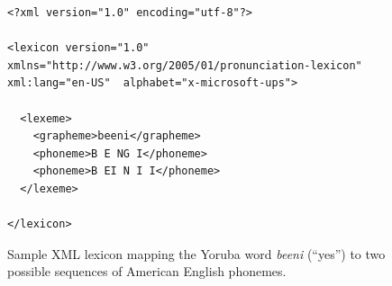 \documentclass[11pt]{article}
\begin{document}

\begin{figure}

\begin{lstlisting}
<?xml version="1.0" encoding="utf-8"?>
	
<lexicon version="1.0" xmlns="http://www.w3.org/2005/01/pronunciation-lexicon" xml:lang="en-US"  alphabet="x-microsoft-ups">
		 
  <lexeme>
    <grapheme>beeni</grapheme>
    <phoneme>B E NG I</phoneme>
    <phoneme>B EI N I I</phoneme>
  </lexeme>
  
</lexicon>
\end{lstlisting}
\caption{Sample XML lexicon mapping the Yoruba word \textit{beeni} (``yes'') to two possible sequences of American English phonemes.\label{fig:lexicon}}
\end{figure}
\end{document}
